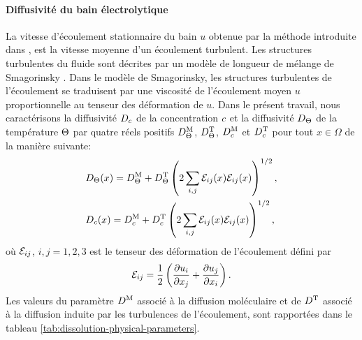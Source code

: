 \paragraph{Diffusivité du bain électrolytique} La vitesse d'écoulement
stationnaire du bain $u$ obtenue par la méthode introduite dans
\cite{Steiner2009}, \cite{Rochat2016} est la vitesse moyenne d'un
écoulement turbulent. Les structures turbulentes du fluide sont
décrites par un modèle de longueur de mélange de Smagorinsky
\cite{Rochat2016}. Dans le modèle de Smagorinsky, les structures
turbulentes de l'écoulement se traduisent par une viscosité de
l'écoulement moyen $u$ proportionnelle au tenseur des déformation de
$u$. Dans le présent travail, nous caractérisons la diffusivité
$D_{c}$ de la concentration $c$ et la
diffusivité $D_\Theta$ de la température $\Theta$ par
quatre réels positifs $D^{\mathrm M}_\Theta$, $D^{\mathrm T}_\Theta$,
$D^{\mathrm M}_c$ et $D^{\mathrm T}_c$ pour tout
$x\in\Omega$ de la manière suivante:
\begin{align}
  &D_\Theta(x) = D^{\mathrm M}_\Theta +
  D^{\mathrm T}_\Theta\left( 2\sum_{i,j}\mathcal E_{ij}(x)\mathcal E_{ij}(x) \right)^{1/2},\\
  &D_{c}(x) = D^{\mathrm M}_c +
  D^{\mathrm T}_c\left( 2\sum_{i,j}\mathcal E_{ij}(x)\mathcal E_{ij}(x) \right)^{1/2},
\end{align}
où $\mathcal E_{ij}$, $i, j = 1,2,3$ est le tenseur des déformation
de l'écoulement défini par
\begin{equation}
  \mathcal E_{ij} = \frac{1}{2}\left( \frac{\partial u_i}{\partial
      x_j} + \frac{\partial u_j}{\partial x_i} \right).
\end{equation}
Les valeurs du paramètre $D^{\mathrm M}$ associé à la diffusion
moléculaire et de $D^{\mathrm T}$ associé à la diffusion
induite par les turbulences de l'écoulement, sont rapportées dans le
tableau \ref{tab:dissolution-physical-parameters}.


